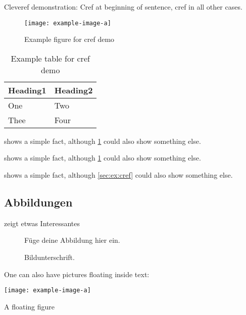 \documentclass[ngerman,runningheads,a4paper]{llncs}[2018/03/10]
\begin{document}
Cleveref demonstration: Cref at beginning of sentence, cref in all other cases.

\begin{figure}
    \centering
    \texttt{[image: example-image-a]}
    \caption{Example figure for cref demo}
    \label{fig:ex:cref}
\end{figure}

\begin{table}
    \centering
    \begin{tabular}{ll}
      \toprule
      Heading1 & Heading2 \\
      \midrule
      One      & Two      \\
      Thee     & Four     \\
      \bottomrule
    \end{tabular}
    \caption{Example table for cref demo}
    \label{tab:ex:cref}
\end{table}

\begin{ltgexample}
 shows a simple fact, although \cref{fig:ex:cref} could also show something else.

 shows a simple fact, although \cref{tab:ex:cref} could also show something else.

 shows a simple fact, although \cref{sec:ex:cref} could also show something else.
\end{ltgexample}
\subsection{Abbildungen}

\begin{ltgexample}
 zeigt etwas Interessantes

\begin{figure}
  \centering
  Füge deine Abbildung hier ein.
  \caption{Bildunterschrift.}
  \label{fig:label}
\end{figure}
\end{ltgexample}

One can also have pictures floating inside text:
\clearpage

\begin{ltgexample}
\begin{floatingfigure}{.33\linewidth}
\texttt{[image: example-image-a]}
\caption{A floating figure}
\end{floatingfigure}
\blindtext[2]
\end{ltgexample}
\end{document}
